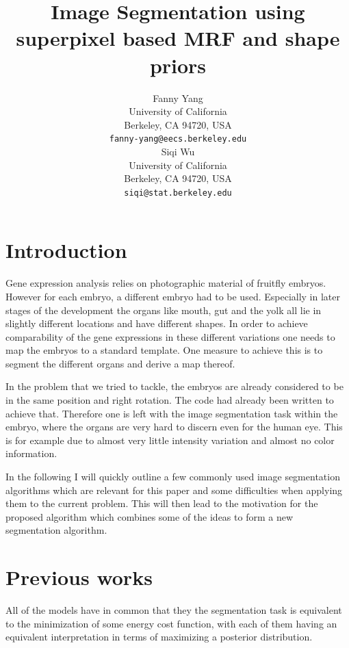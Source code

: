 \documentclass{article} %
\begin{document}
\title{Image Segmentation using superpixel based MRF and shape priors}

\author{
Fanny Yang\\
University of California\\
Berkeley, CA 94720, USA\\
\texttt{fanny-yang@eecs.berkeley.edu} \\
\And
Siqi Wu\\
University of California\\
Berkeley, CA 94720, USA\\
\texttt{siqi@stat.berkeley.edu}\\
}

\maketitle

\section{Introduction}
Gene expression analysis relies on photographic material of fruitfly embryos. However for each embryo, a different embryo had to be used. Especially in later stages of the development the organs like mouth, gut and the yolk all lie in slightly different locations and have different shapes. In order to achieve comparability of the gene expressions in these different variations one needs to map the embryos to a standard template. One measure to achieve this is to segment the different organs and derive a map thereof. 

In the problem that we tried to tackle, the embryos are already considered to be in the same position and right rotation. The code had already been written to achieve that. Therefore one is left with the image segmentation task within the embryo, where the organs are very hard to discern even for the human eye. This is for example due to almost very little intensity variation and almost no color information.

In the following I will quickly outline a few commonly used image segmentation algorithms which are relevant for this paper and some difficulties when applying them to the current problem. This will then lead to the motivation for the proposed algorithm which combines some of the ideas to form a new segmentation algorithm.

\section{Previous works}
All of the models have in common that they the segmentation task is equivalent to the minimization of some energy cost function, with each of them having an equivalent interpretation in terms of maximizing a posterior distribution. 
\end{document}
